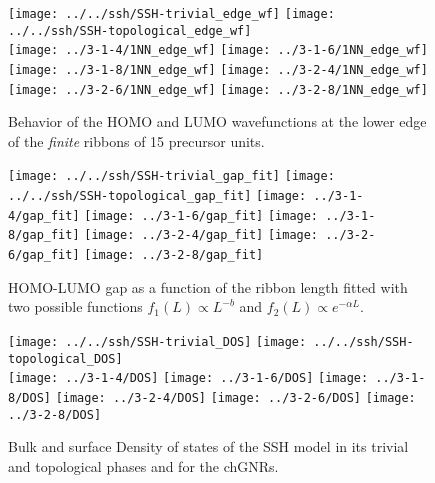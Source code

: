 \documentclass[amsmath,%
amssymb,prb,superscriptaddress]{revtex4}
\begin{document}
\begin{figure*}
	\texttt{[image: ../../ssh/SSH-trivial\_edge\_wf]}
	\texttt{[image: ../../ssh/SSH-topological\_edge\_wf]}\\
	\texttt{[image: ../3-1-4/1NN\_edge\_wf]}
	\texttt{[image: ../3-1-6/1NN\_edge\_wf]}
	\texttt{[image: ../3-1-8/1NN\_edge\_wf]}
	\texttt{[image: ../3-2-4/1NN\_edge\_wf]}
	\texttt{[image: ../3-2-6/1NN\_edge\_wf]}
	\texttt{[image: ../3-2-8/1NN\_edge\_wf]}
	\caption{Behavior of the HOMO and LUMO wavefunctions at the lower edge of the \emph{finite} ribbons of 15 precursor units.}
\end{figure*}

\begin{figure*}
	\texttt{[image: ../../ssh/SSH-trivial\_gap\_fit]}
	\texttt{[image: ../../ssh/SSH-topological\_gap\_fit]}
	\texttt{[image: ../3-1-4/gap\_fit]}
	\texttt{[image: ../3-1-6/gap\_fit]}
	\texttt{[image: ../3-1-8/gap\_fit]}
	\texttt{[image: ../3-2-4/gap\_fit]}
	\texttt{[image: ../3-2-6/gap\_fit]}
	\texttt{[image: ../3-2-8/gap\_fit]}	
	\caption{HOMO-LUMO gap as a function of the ribbon length fitted with two possible functions $f_{1}(L) \propto L^{-b}$ and $f_{2}(L) \propto e^{-\alpha L}$.}			
\end{figure*}

\begin{figure*}
	\texttt{[image: ../../ssh/SSH-trivial\_DOS]}
	\texttt{[image: ../../ssh/SSH-topological\_DOS]}\\
	\texttt{[image: ../3-1-4/DOS]}
	\texttt{[image: ../3-1-6/DOS]}
	\texttt{[image: ../3-1-8/DOS]}
	\texttt{[image: ../3-2-4/DOS]}
	\texttt{[image: ../3-2-6/DOS]}
	\texttt{[image: ../3-2-8/DOS]}
	\caption{Bulk and surface Density of states of the SSH model in its trivial and topological phases and for the chGNRs.}		
\end{figure*}

% 
\end{document}
